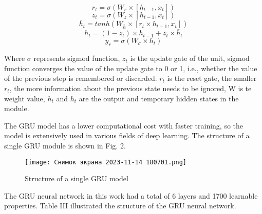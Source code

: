 

\renewcommand{\thetable}{\Roman{table}}
\captionsetup[table]{labelsep=newline, singlelinecheck = false, justification= centering}
\begin{equation}
r_t = \sigma (W_r × [h_{t-1}, x_t])
\end{equation}
\begin{equation}
z_t = \sigma (W_z × [h_{t-1}, x_t])
\end{equation}
\begin{equation}
\bar h_t = tanh(W_{\bar h} \times [r_t \times h_{t-1}, x_t])
\end{equation}
\begin{equation}
h_t = (1 - z_t) \times h_{t-1} + z_t \times \bar h_t
\end{equation} 
\begin{equation}
y_r = \sigma(W_\sigma \times h_t)
\end{equation}
\par
Where $\sigma$ represents sigmod function, $z_t$ is the update
gate of the unit, sigmod function converges the value
of the update gate to 0 or 1, i.e., whether the value of
the previous step is remembered or discarded. $r_t$ is the
reset gate, the smaller $r_t$, the more information about
the previous state needs to be ignored, W is te weight
value, $h_t$ and $\bar h_t$ are the output and temporary hidden
states in the module.
\par
The GRU model has a lower computational cost with
faster training, so the model is extensively used in various
fields of deep learning. The structure of a single GRU
module is shown in Fig. 2.

\setcounter{figure}{1}

\begin{figure}[!h]
\centering
\texttt{[image: Снимок экрана 2023-11-14 180701.png]}
\caption{Structure of a single GRU model}
\end{figure}

\par
The GRU neural network in this work had a total of 6
layers and 1700 learnable properties. Table III illustrated
the structure of the GRU neural network.

